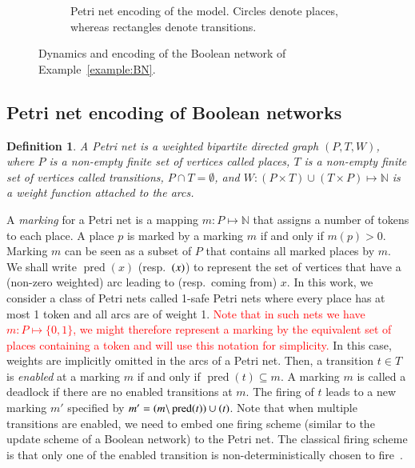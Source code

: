 \documentclass[preprint,12pt]{elsarticle}
\newtheorem{definition}{Definition}[section]
\newcommand{\change}[1]{\textcolor{red}{#1}}
\DeclareMathOperator{\pred}{pred}
\let\succ\relax
\DeclareMathOperator{\succ}{succ}
\begin{document}
\begin{figure}[!htb]
\begin{subfigure}[b]{0.6\textwidth}
\caption{Petri net encoding of the model. Circles denote places, whereas rectangles denote transitions.}%
\label{fig:PN}
\end{subfigure}%
\caption{Dynamics and encoding of the Boolean network of Example~\ref{example:BN}.}%
\label{fig:stg_and_PN}
\end{figure}

\subsection{Petri net encoding of Boolean networks}%
\label{sec:encoding}

\begin{definition}

  A \emph{Petri net} is a weighted bipartite directed graph \((P, T, W)\),
  where \(P\) is a non-empty finite set of vertices called \emph{places},
  \(T\) is a non-empty finite set of vertices called \emph{transitions},
  \(P \cap T = \emptyset\),
  and \(W : (P \times T) \cup (T \times P) \mapsto \mathbb{N} \) is a weight function attached to the arcs.

\end{definition}
A \emph{marking} for a Petri net is a mapping \(m : P \mapsto \mathbb{N}\) that assigns a number of tokens to each place.
A place \(p\) is marked by a marking \(m\) if and only if \(m(p) > 0\).
Marking \(m\) can be seen as a subset of \(P\) that contains all marked places by \(m\).
We shall write \(\pred(x)\) (resp.\ \(\succ(x)\)) to represent the set of vertices that have a (non-zero weighted) arc leading to (resp.\ coming from) \(x\).
In this work, we consider a class of Petri nets called 1-safe Petri nets where every place has at most 1 token and all arcs are of weight 1.
\change{Note that in such nets we have \(m : P \mapsto \{0,1\}\), we might therefore represent a marking by the equivalent set of places containing a token and will use this notation for simplicity.}
In this case, weights are implicitly omitted in the arcs of a Petri net.
Then, a transition \(t \in T\) is \emph{enabled} at a marking \(m\) if and only if \(\pred(t) \subseteq m\).
A marking \(m\) is called a deadlock if there are no enabled transitions at \(m\).
The firing of \(t\) leads to a new marking \(m'\) specified by \(m' = (m \backslash \pred(t)) \cup \succ(t)\).
Note that when multiple transitions are enabled, we need to embed one firing scheme (similar to the update scheme of a Boolean network) to the Petri net.
The classical firing scheme is that only one of the enabled transition is non-deterministically chosen to fire~\cite{Murata1989}.
\end{document}
